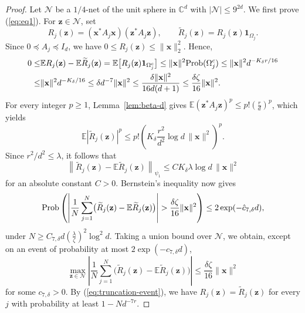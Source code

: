 \documentclass{article}
\renewcommand{\eqref}[1]{(\ref{#1})}
\newcommand{\C}{{\mathbb C}}
\newcommand{\E}{{\mathbb E}}
\newcommand{\Prob}{{\rm Prob}}
\newcommand{\vx}{{\mathbf x}}
\newcommand{\vz}{{\mathbf z}}
\newcommand{\0}{{\mathbf 0}}
\numberwithin{equation}{section}
\begin{document}
\begin{proof}
		Let $\mathcal N$ be a $1/4$-net of the unit sphere in $\C^d$ with
		$|\mathcal N|\le9^{2d}$. We first prove \eqref{eq:eq1}. For
		$\vz\in\mathcal N$, set
		\[
		R_j(\vz)=(\vx^*A_j\vx)(\vz^*A_j\vz),
		\qquad
		\widetilde R_j(\vz)=R_j(\vz)\mathbf1_{\Omega_j}.
		\]
		Since $0\preceq A_j\preceq I_d$, we have
		$0\le R_j(\vz)\le\|\vx\|_2^2$. Hence, 
		\begin{equation}\label{eq:truncation-bias}
			\begin{aligned}
				0\le&\E R_j(\vz)-\E\widetilde R_j(\vz)
				=\E\bigl[R_j(\vz)\mathbf1_{\Omega_j^c}\bigr]
				\le\|\vx\|^2\Prob(\Omega_j^c)\le\|\vx\|^2d^{-K_\delta r/16}\\
				\le&\|\vx\|^2d^{-K_\delta /16}\le\delta d^{-7}\|\vx\|^2\le\frac{\delta\|\vx\|^2}{16d(d+1)}
				\le\frac{\delta\zeta}{16}\|\vx\|^2.
			\end{aligned}
		\end{equation}
		For every integer $p\ge1$, Lemma~\ref{lem:beta-d} gives $\E(\vz^*A_j\vz)^p
		\le p!\left(\frac rd\right)^p$, which yields
		\begin{equation*}\label{eq:truncated-moment}
			\E|\widetilde R_j(\vz)|^p
			\le p!\left(
			K_\delta\frac{r^2}{d^2}\log d\,\|\vx\|^2
			\right)^p.
		\end{equation*}
		Since $r^2/d^2\le\lambda$, it follows that
		\begin{equation}\label{eq:psi1-bound}
			\left\|\widetilde R_j(\vz)
			-\E\widetilde R_j(\vz)\right\|_{\psi_1}
			\le C K_\delta\lambda\log d\,\|\vx\|^2
		\end{equation}
		for an absolute constant $C>0$. Bernstein's inequality now gives
		\begin{align*}
			\Prob\left(
			\left|\frac1N\sum_{j=1}^N
			\bigl(\widetilde R_j(\vz)-\E\widetilde R_j(\vz)\bigr)\right|
			>\frac{\delta\zeta}{16}\|\vx\|^2
			\right)
			\le
			2\exp(-\hat c_{7,\delta} d),
			\label{eq:scalar-bernstein}
		\end{align*}
		under $N\ge C_{7,\delta} d
		\left(\frac{\lambda}{\zeta}\right)^2\log^2d$. 
		Taking a union
		bound over $\mathcal N$, we obtain, except on an event of probability
		at most $2\exp(-c_{7,\delta}d)$,
		\begin{equation}\label{eq:uniform-truncated-X}
			\max_{\vz\in\mathcal N}
			\left|\frac1N\sum_{j=1}^N
			\bigl(\widetilde R_j(\vz)-\E\widetilde R_j(\vz)\bigr)\right|
			\le\frac{\delta\zeta}{16}\|\vx\|^2
		\end{equation}
		for some $c_{7,\delta}>0$. 
		By \eqref{eq:truncation-event}, we have
		$R_j(\vz)=\widetilde R_j(\vz)$ for every $j$ with probability at least $1-Nd^{-7r}$.

\end{proof}
\end{document}
